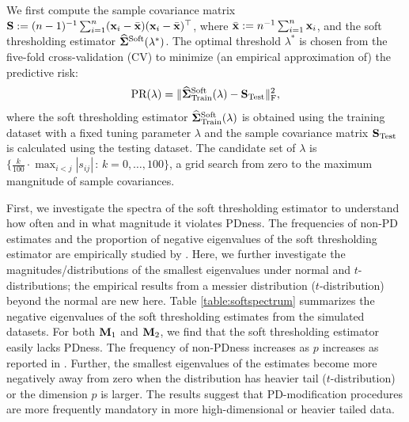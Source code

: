 \documentclass[times,sort&compress,3p]{elsarticle}
\begin{document}
We first compute the sample covariance matrix ${\bf S} : = (n-1)^{-1}\sum_{i=1}^{n} ({\bf x}_i - \bar{\bf x}) ({\bf x}_i - \bar{\bf x})^{\top}$,
where $\bar{\bf x} := n^{-1}\sum_{i=1}^{n}{\bf x}_i$, and
the soft thresholding estimator $\widehat{\bf \Sigma}^{\rm Soft}({\lambda^*})$. 
The optimal threshold $\lambda^*$ is chosen from the five-fold cross-validation (CV) to minimize (an empirical approximation of) the predictive risk:
\[
{\rm PR(\lambda)} = \|\widehat{\bf{\Sigma}}_{\rm Train}^{\rm Soft}(\lambda) - {\bf S}_{\rm Test}\|_{\rm F}^2,
\]
where the soft thresholding estimator $\widehat{\bf{\Sigma}}_{\rm Train}^{\rm Soft}(\lambda)$ is obtained using the training dataset with a fixed tuning parameter $\lambda$ and the sample covariance matrix ${\bf S}_{\rm Test}$ is calculated using the testing dataset.
The candidate set of $\lambda$ is 
 $\big\{ \frac{k}{100} \cdot \max_{i < j} |s_{ij}| \,:\, k = 0, \ldots, 100 \big\}$, a grid search from zero to the maximum mangnitude of sample covariances.
 

First, we investigate the spectra of the soft thresholding estimator to understand
how often and in what magnitude it violates PDness. 
The frequencies of non-PD estimates and the proportion of negative eigenvalues 
of the soft thresholding estimator are empirically studied by \citet{Xue2012}. Here, 
we further investigate the magnitudes/distributions of the smallest eigenvalues under normal and $t$-distributions;  
the empirical results from a messier distribution ($t$-distribution) beyond the normal are new here. 
Table \ref{table:softspectrum}
summarizes the negative eigenvalues of the soft thresholding estimates from
the simulated datasets. 
For both ${\bf M}_1$ and ${\bf M}_2$, we find
that the soft thresholding estimator easily lacks PDness.
The frequency of non-PDness increases as $p$ increases as reported in \citet{Xue2012}. Further,
the smallest eigenvalues of the estimates become more negatively away from zero 
when the distribution has heavier tail ($t$-distribution) or the dimension $p$ is larger. The results suggest 
that PD-modification procedures are more frequently mandatory in more high-dimensional or heavier tailed data.
\end{document}
